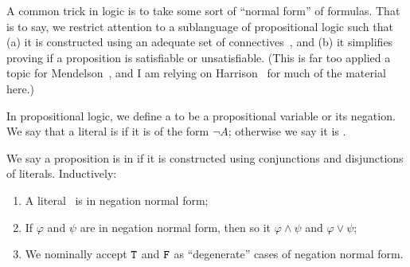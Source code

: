 \begin{node}\label{prop-000P}%
A common trick in logic is to take some sort of ``normal form'' of
formulas. That is to say, we restrict attention to a sublanguage of
propositional logic such that (a) it is constructed using an adequate
set of connectives~, and (b) it simplifies proving if a
proposition is satisfiable or unsatisfiable. (This is far too applied a
topic for Mendelson~\cite{mendelson2015mathematical}, and I am relying on
Harrison~\cite{harrison2009handbook} for much of the material here.)

\begin{definition}\label{prop-000Q}%
In propositional logic, we define a  to be a
propositional variable or its negation. We say that a literal is
 if it is of the form $\neg A$; otherwise we say it is
. 
\end{definition}

\begin{definition}\label{prop-000O}%
We say a proposition is in  if it is
constructed using conjunctions and disjunctions of
literals. Inductively:
\begin{enumerate}
\item A literal~ is in negation normal form;
\item If $\varphi$ and $\psi$ are in negation normal form, then so it
  $\varphi\land\psi$ and $\varphi\lor\psi$;
\item We nominally accept $\mathtt{T}$ and $\mathtt{F}$ as ``degenerate'' cases
  of negation normal form.
\end{enumerate}
\end{definition}


\end{node}
